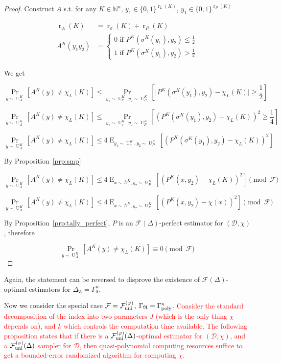 \documentclass[11pt]{article}
\numberwithin{equation}{section}
\theoremstyle{definition}
\theoremstyle{plain}
\newcommand{\Bool}{\{0,1\}}
\DeclareMathOperator{\Prb}{Pr}
\DeclareMathOperator{\E}{E}
\DeclareMathOperator{\R}{r}
\DeclareMathOperator{\Un}{U}
\newcommand{\Nats}{\mathbb{N}}
\newcommand{\Abs}[1]{\lvert #1 \rvert}
\newcommand{\Dist}{\mathcal{D}}
\newcommand{\GrowR}{\Gamma_{\mathfrak{R}}}
\newcommand{\Fall}{\mathcal{F}}
\newcommand{\BoolR}[1]{\Bool^{\R_{#1}(K)}}
\newcommand{\GammaPoly}{\Gamma_{\textnormal{poly}}}
\newcommand{\FallUt}[1]{{\Fall_{\textnormal{uni}}^{(#1)}}}
\begin{document}
\begin{proof}

Construct ${A}$ s.t. for any ${K \in \Nats^n}$, ${y_1 \in \BoolR{L}}$, ${y_1 \in \BoolR{P}}$

\begin{align*}
\R_A(K) &= \R_\sigma(K)+\R_P(K) \\
A^K(y_1 y_2) &= \begin{cases}0 \text{ if } P^K(\sigma^K(y_1),y_2) \leq \frac{1}{2} \\ 1 \text{ if } P^K(\sigma^K(y_1),y_2) > \frac{1}{2} \end{cases}
\end{align*}

We get

\[\Prb_{y \sim \Un_A^K}[A^K(y) \neq \chi_L(K)] \leq \Prb_{y_1 \sim \Un_\sigma^K,y_2 \sim \Un_P^K}\left[\Abs{P^K(\sigma^K(y_1),y_2) - \chi_L(K)} \geq \frac{1}{2}\right]\]

\[\Prb_{y \sim \Un_A^K}[A^K(y) \neq \chi_L(K)] \leq \Prb_{y_1 \sim \Un_\sigma^K,y_2 \sim \Un_P^K}\left[(P^K(\sigma^K(y_1),y_2) - \chi_L(K))^2 \geq \frac{1}{4}\right]\]

\[\Prb_{y \sim \Un_A^K}[A^K(y) \neq \chi_L(K)] \leq 4 \E_{y_1 \sim \Un_\sigma^K,y_2 \sim \Un_P^K}[(P^K(\sigma^K(y_1),y_2) - \chi_L(K))^2]\]

By Proposition~\ref{prp:smp}

\[\Prb_{y \sim \Un_A^K}[A^K(y) \neq \chi_L(K)] \leq 4 \E_{x \sim \Dist^K,y_2 \sim \Un_P^K}[(P^K(x,y_2) - \chi_L(K))^2] \pmod \Fall\]

\[\Prb_{y \sim \Un_A^K}[A^K(y) \neq \chi_L(K)] \leq 4 \E_{x \sim \Dist^K,y_2 \sim \Un_P^K}[(P^K(x,y_2) - \chi(x))^2] \pmod \Fall\]

By Proposition~\ref{prp:tally_perfect}, ${P}$ is an ${\Fall(\Delta)}$-perfect estimator for ${(\Dist,\chi)}$, therefore

\[\Prb_{y \sim \Un_A^K}[A^K(y) \neq \chi_L(K)] \equiv 0 \pmod \Fall\]
%
\end{proof}

Again, the statement can be reversed to disprove the existence of ${\Fall(\Delta)}$-optimal estimators for ${\Delta_{\mathfrak{A}}}=\Gamma_0^n$.

Now we consider the special case ${\Fall=\FallUt{\varphi}}$, ${\GrowR = \GammaPoly^n}$. \textcolor{red}{Consider the standard decomposition of the index into two parameters $J$ (which is the only thing $\chi$ depends on), and $k$ which controls the computation time available. The following proposition states that if there is a $\FallUt{\varphi}(\Delta)$-optimal estimator for $(\Dist,\chi)$, and a $\FallUt{\varphi}(\Delta)$ sampler for $\Dist$, then quasi-polynomial computing resources suffice to get a bounded-error randomized algorithm for computing $\chi$.}
\end{document}
